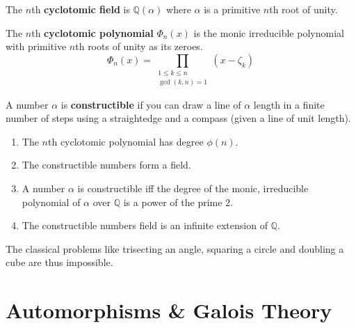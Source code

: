\begin{definition}
	The $n$th \textbf{cyclotomic field} is $\mathbb{Q}(\alpha)$ where $\alpha$ is a primitive $n$th root of unity.
\end{definition}

\begin{definition}
	The $n$th \textbf{cyclotomic polynomial} $\Phi_n(x)$ is the monic irreducible polynomial with primitive $n$th roots of unity as its zeroes.
	$$ \Phi_n(x) = \prod_{\substack{1 \le k \le n \\ \gcd(k,n)=1}} \!\!\!\!\!\left(x-\zeta_k\right)$$
\end{definition}

\begin{definition}
	A number $\alpha$ is \textbf{constructible} if you can draw a line of $\alpha$ length in a finite number of steps using a straightedge and a compass (given a line of unit length).
\end{definition}

\begin{enumerate}
	\item The $n$th cyclotomic polynomial has degree $\phi(n)$.
	\item The constructible numbers form a field.
	\item A number $\alpha$ is constructible iff the degree of the monic, irreducible polynomial of $\alpha$ over $\mathbb{Q}$ is a power of the prime $2$.
	\item The constructible numbers field is an infinite extension of $\mathbb{Q}$.
\end{enumerate}
	The classical problems like trisecting an angle, squaring a circle and doubling a cube are thus impossible.


\section{Automorphisms \& Galois Theory}
